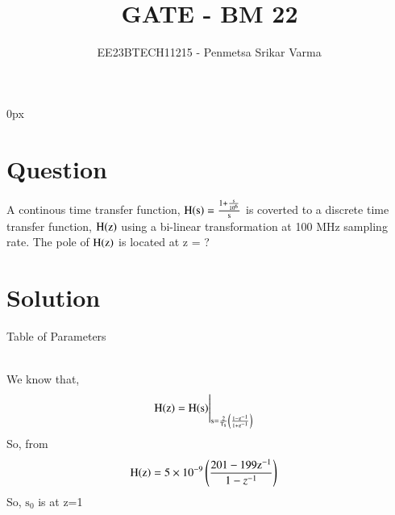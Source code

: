 \documentclass[beamer]{IEEEtran}
\theoremstyle{remark}
\begin{document}

\parindent 0px


\title{GATE - BM 22}
\author{EE23BTECH11215 - Penmetsa Srikar Varma$^{}$%
}
\maketitle
\newpage
\bigskip

\renewcommand{\thefigure}{\theenumi}
\renewcommand{\thetable}{\theenumi}
\section*{Question}
A continous time transfer function, $\text{H\ensuremath{\left(\text{s}\right)}}=\frac{1+\frac{\text{s}}{10^6}}{\text{s}}$ is coverted to a discrete time transfer function, $\text{H\ensuremath{\left(\text{z}\right)}}$ using a bi-linear transformation at 100 MHz sampling rate. The pole of $\text{H\ensuremath{\left(\text{z}\right)}}$ is located at z = ? 
\section*{Solution}
\begin{table}[h]
    \centering
    
    \label{parameter table}
\end{table}
\begin{center}
    Table of Parameters\\[5ex]
\end{center}

\\

We know that,
\begin{align}
\label{1}
    \text{H\ensuremath{\left(\text{z}\right)}}&=\text{H\ensuremath{\left(\text{s}\right)}}\Bigg|_{\text{s}=\frac{2}{\text{T}_\text{s}}\left(\frac{1-\text{z}^{-1}}{1+\text{z}^{-1}}\right)}
\end{align}
So, from \brak{\ref{1}}
\begin{align}
    \text{H\ensuremath{\left(\text{z}\right)}}&=5\times10^{-9}\left(\frac{201-199\text{z}^{-1}}{1-z^{-1}}\right)
\end{align}
So, $\text{s}_0$ is at z=1\\
\end{document}
